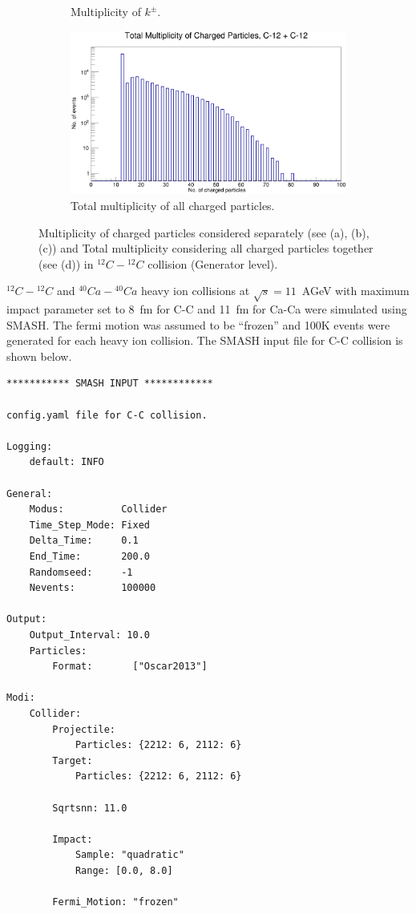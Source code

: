 \documentclass[12pt, twocolumn]{article}
\begin{document}
\begin{figure}[h]
\begin{subfigure}[h]{0.49\textwidth}
\caption{Multiplicity of $k^{\pm}$.}
\label{Multiplicity of kaons C12.}
\end{subfigure}
\hfill
\begin{subfigure}[h]{0.49\textwidth}
\centering
\includegraphics[scale=0.14]{GeneratorTotalMultiplicity_C12.png}
\caption{Total multiplicity of all charged particles.}
\label{Total multiplicity of all charged particles C12.}
\end{subfigure}
\caption{Multiplicity of charged particles considered separately (see (a), (b), (c)) and Total multiplicity considering all charged particles together (see (d)) in $^{12}C-{^{12}C}$ collision (Generator level).}
\label{Multiplicity of charged particles considered separately and Total multiplicity considering all charged particles together in C12-C12 collision (Generator stage).}
\end{figure}

$^{12}C-{^{12}C}$ and $^{40}Ca-{^{40}Ca}$ heavy ion collisions at $\sqrt{s}=11$~AGeV with maximum impact parameter set to 8~fm for C-C and 11~fm for Ca-Ca were simulated using SMASH. The fermi motion was assumed to be ``frozen'' and 100K events were generated for each heavy ion collision. The SMASH input file for C-C collision is shown below. 
\begin{verbatim}
*********** SMASH INPUT ************

config.yaml file for C-C collision.

Logging:
    default: INFO

General:
    Modus:          Collider
    Time_Step_Mode: Fixed
    Delta_Time:     0.1
    End_Time:       200.0
    Randomseed:     -1
    Nevents:        100000

Output:
    Output_Interval: 10.0
    Particles:
        Format:       ["Oscar2013"]

Modi:
    Collider:
        Projectile:
            Particles: {2212: 6, 2112: 6}
        Target:
            Particles: {2212: 6, 2112: 6}
            
        Sqrtsnn: 11.0
        
        Impact:
            Sample: "quadratic"
            Range: [0.0, 8.0]

        Fermi_Motion: "frozen"
    
\end{verbatim}
\end{document}
